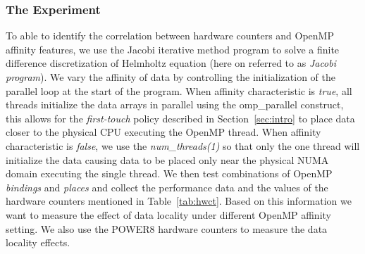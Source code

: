 \subsubsection{The Experiment}
To able to identify the correlation between hardware counters and OpenMP affinity features, we use the Jacobi iterative method program to solve a 
finite difference discretization of Helmholtz equation (here on referred to as \textit{Jacobi program}). We vary the affinity of data by controlling the initialization of the parallel loop at the start of the program. 
When affinity characteristic is \textit{true}, all threads initialize the data arrays in parallel using the omp\_parallel construct, this allows for the 
\textit{first-touch} policy described in Section~\ref{sec:intro} to place data closer to the physical CPU executing the OpenMP thread. When 
affinity characteristic is \textit{false}, we use the \textit{num\_threads(1)} so that only the one thread will initialize the data causing data to be placed only near the physical NUMA domain executing the single thread. We then test combinations of OpenMP \textit{bindings} and \textit{places} and collect the performance data and the values of the hardware counters mentioned in Table~\ref{tab:hwct}. Based on this information we want to measure the effect of data locality under different OpenMP affinity setting. We also use the POWER8 hardware counters to measure the data locality effects.

